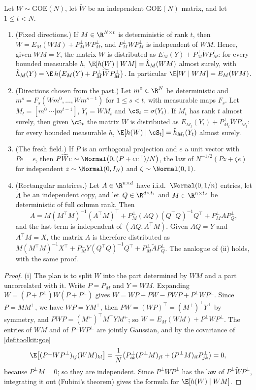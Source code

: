 \begin{refsection}
\begin{lemma}\label{lem:toolkit:conditioning}
Let $W\sim\mathrm{GOE}(N)$, let $\widetilde W$ be an independent $\mathrm{GOE}(N)$ matrix, and let $1\le t<N$.
\begin{enumerate}
\item (Fixed directions.) If $M\in\R^{N\times t}$ is deterministic of rank $t$, then $W=E_M(WM)+P_M^\perp WP_M^\perp$, and $P_M^\perp WP_M^\perp$ is independent of $WM$. Hence, given $WM=Y$, the matrix $W$ is distributed as $E_M(Y)+P_M^\perp\widetilde WP_M^\perp$: for every bounded measurable $h$, $\E[h(W)\mid WM]=\hat h_M(WM)$ almost surely, with $\hat h_M(Y)=\E\,h\bigl(E_M(Y)+P_M^\perp\widetilde WP_M^\perp\bigr)$. In particular $\E[W\mid WM]=E_M(WM)$.
\item (Directions chosen from the past.) Let $m^0\in\R^N$ be deterministic and $m^s=F_s(Wm^0,\dots,Wm^{s-1})$ for $1\le s<t$, with measurable maps $F_s$. Let $M_t=[m^0|\cdots|m^{t-1}]$, $Y_t=WM_t$ and $\cS_t=\sigma(Y_t)$. If $M_t$ has rank $t$ almost surely, then given $\cS_t$ the matrix $W$ is distributed as $E_{M_t}(Y_t)+P_{M_t}^\perp\widetilde WP_{M_t}^\perp$: for every bounded measurable $h$, $\E[h(W)\mid\cS_t]=\hat h_{M_t}(Y_t)$ almost surely.
\item (The fresh field.) If $P$ is an orthogonal projection and $e$ a unit vector with $Pe=e$, then $P\widetilde We\sim\Normal\bigl(0,(P+ee^\top)/N\bigr)$, the law of $N^{-1/2}(Pz+\zeta e)$ for independent $z\sim\Normal(0,I_N)$ and $\zeta\sim\Normal(0,1)$.
\item (Rectangular matrices.) Let $A\in\R^{n\times d}$ have i.i.d.\ $\Normal(0,1/n)$ entries, let $\widetilde A$ be an independent copy, and let $Q\in\R^{d\times t_1}$ and $M\in\R^{n\times t_2}$ be deterministic of full column rank. Then
\[
A=M(M^\top M)^{-1}(A^\top M)^\top+P_M^\perp(AQ)(Q^\top Q)^{-1}Q^\top+P_M^\perp AP_Q^\perp,
\]
and the last term is independent of $(AQ,A^\top M)$. Given $AQ=Y$ and $A^\top M=X$, the matrix $A$ is therefore distributed as $M(M^\top M)^{-1}X^\top+P_M^\perp Y(Q^\top Q)^{-1}Q^\top+P_M^\perp\widetilde AP_Q^\perp$. The analogue of (ii) holds, with the same proof.
\end{enumerate}
\end{lemma}

\begin{proof}
(i) The plan is to split $W$ into the part determined by $WM$ and a part uncorrelated with it. Write $P=P_M$ and $Y=WM$. Expanding $W=(P+P^\perp)W(P+P^\perp)$ gives $W=WP+PW-PWP+P^\perp WP^\perp$. Since $P=MM^+$, we have $WP=YM^+$, then $PW=(WP)^\top=(M^+)^\top Y^\top$ by symmetry, and $PWP=(M^+)^\top M^\top YM^+$; so $W=E_M(WM)+P^\perp WP^\perp$. The entries of $WM$ and of $P^\perp WP^\perp$ are jointly Gaussian, and by the covariance of \cref{def:toolkit:goe}
\[
\E\bigl[(P^\perp WP^\perp)_{ij}(WM)_{kl}\bigr]=\frac1N\bigl(P^\perp_{ik}(P^\perp M)_{jl}+(P^\perp M)_{il}P^\perp_{jk}\bigr)=0,
\]
because $P^\perp M=0$; so they are independent. Since $P^\perp WP^\perp$ has the law of $P^\perp\widetilde WP^\perp$, integrating it out (Fubini's theorem) gives the formula for $\E[h(W)\mid WM]$.


\end{proof}
\end{refsection}
